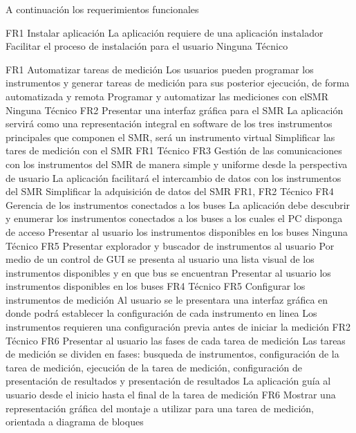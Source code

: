 \documentclass[paper=a4,oneside,fontsize=12pt]{article}
\newcommand{\SMR}{SMR\xspace}
\begin{document}
	A continuación los requerimientos funcionales
	
		{FR1}
			{Instalar aplicación}
			{La aplicación requiere de una aplicación instalador}
			{Facilitar el proceso de instalación para el usuario}
			{Ninguna}
			{Técnico}
		
		{FR1}
			{Automatizar tareas de medición}
			{Los usuarios pueden programar los instrumentos y generar tareas de medición para sus posterior ejecución, de forma automatizada y remota}
			{Programar y automatizar las mediciones con el\SMR}
			{Ninguna}
			{Técnico}
		{FR2}
			{Presentar una interfaz gráfica para el \SMR}
			{La aplicación servirá como una representación integral en software de los tres instrumentos principales que componen el \SMR, será un instrumento virtual}
			{Simplificar las tares de medición con el \SMR}
			{FR1}
			{Técnico}
		{FR3}
			{Gestión de las comunicaciones con los instrumentos del \SMR de manera simple y uniforme desde la perspectiva de usuario}
			{La aplicación facilitará el intercambio de datos con los instrumentos del \SMR}
			{Simplificar la adquisición de datos del \SMR}
			{FR1, FR2}
			{Técnico}				
		{FR4}
			{Gerencia de los instrumentos conectados a los buses}
			{La aplicación debe descubrir y enumerar los instrumentos conectados a los buses a los cuales el PC disponga de acceso}
			{Presentar al usuario los instrumentos disponibles en los buses}
			{Ninguna}
			{Técnico}
		{FR5}
			{Presentar explorador y buscador de instrumentos al usuario}
			{Por medio de un control de GUI se presenta al usuario una lista visual de los instrumentos disponibles y en que bus se encuentran}
			{Presentar al usuario los instrumentos disponibles en los buses}
			{FR4}
			{Técnico}
		{FR5}
			{Configurar los instrumentos de medición}
			{Al usuario se le presentara una interfaz gráfica en donde podrá establecer la configuración de cada instrumento en linea}
			{Los instrumentos requieren una configuración previa antes de iniciar la medición}
			{FR2}
			{Técnico}
		{FR6}
			{Presentar al usuario las fases de cada tarea de medición}
			{Las tareas de medición se dividen en fases: busqueda de instrumentos, configuración de la tarea de medición, ejecución de la tarea de medición, configuración de presentación de resultados y presentación de resultados}
			{La aplicación guía al usuario desde el inicio hasta el final de la tarea de medición}
		{FR6}
			{Mostrar una representación gráfica del montaje a utilizar para una tarea de medición, orientada a diagrama de bloques}
\end{document}
